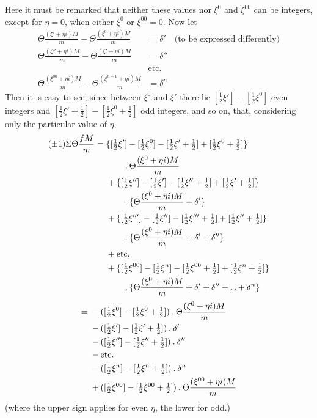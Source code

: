Here it must be remarked that neither these values nor $\xi^0$ and $\xi^{00}$ can be integers, except for $\eta=0$, when either $\xi^0$ or $\xi^{00}=0$. Now let
\[
\begin{aligned}
\Theta\frac{(\xi'+\eta i)M}{m}-\Theta\frac{(\xi^0+\eta i)M}{m}&=\delta'\quad\text{(to be expressed differently)}\\
\Theta\frac{(\xi''+\eta i)M}{m}-\Theta\frac{(\xi'+\eta i)M}{m}&=\delta''\\
&\text{etc.}\\
\Theta\frac{(\xi^{00}+\eta i)M}{m}-\Theta\frac{(\xi^{n-1}+\eta i)M}{m}&=\delta^n
\end{aligned}
\]
Then it is easy to see, since between $\xi^0$ and $\xi'$ there lie $[\frac12\xi']-[\frac12\xi^0]$ even integers and $[\frac12\xi'+\frac12]-[\frac12\xi^0+\frac12]$ odd integers, and so on, that, considering only the particular value of $\eta$,
\[
\begin{aligned}
(\pm1)\Sigma\Theta\frac{fM}{m}
={}&\{[\tfrac12\xi']-[\tfrac12\xi^0]-[\tfrac12\xi'+\tfrac12]+[\tfrac12\xi^0+\tfrac12]\}\\
&\qquad\mathbin{.}\Theta\frac{(\xi^0+\eta i)M}{m}\\
&+\{[\tfrac12\xi'']-[\tfrac12\xi']-[\tfrac12\xi''+\tfrac12]+[\tfrac12\xi'+\tfrac12]\}\\
&\qquad\mathbin{.}\{\Theta\frac{(\xi^0+\eta i)M}{m}+\delta'\}\\
&+\{[\tfrac12\xi''']-[\tfrac12\xi'']-[\tfrac12\xi'''+\tfrac12]+[\tfrac12\xi''+\tfrac12]\}\\
&\qquad\mathbin{.}\{\Theta\frac{(\xi^0+\eta i)M}{m}+\delta'+\delta''\}\\
&+\text{etc.}\\
&+\{[\tfrac12\xi^{00}]-[\tfrac12\xi^n]-[\tfrac12\xi^{00}+\tfrac12]+[\tfrac12\xi^n+\tfrac12]\}\\
&\qquad\mathbin{.}\{\Theta\frac{(\xi^0+\eta i)M}{m}+\delta'+\delta''+\mathinner{.\,.}+\delta^n\}
\end{aligned}
\]
\[
\begin{aligned}
={}&-([\tfrac12\xi^0]-[\tfrac12\xi^0+\tfrac12])\mathbin{.}\Theta\frac{(\xi^0+\eta i)M}{m}\\
&-([\tfrac12\xi']-[\tfrac12\xi'+\tfrac12])\mathbin{.}\delta'\\
&-([\tfrac12\xi'']-[\tfrac12\xi''+\tfrac12])\mathbin{.}\delta''\\
&-\text{etc.}\\
&-([\tfrac12\xi^n]-[\tfrac12\xi^n+\tfrac12])\mathbin{.}\delta^n\\
&+([\tfrac12\xi^{00}]-[\tfrac12\xi^{00}+\tfrac12])\mathbin{.}\Theta\frac{(\xi^{00}+\eta i)M}{m}
\end{aligned}
\]
(where the upper sign applies for even $\eta$, the lower for odd.)

